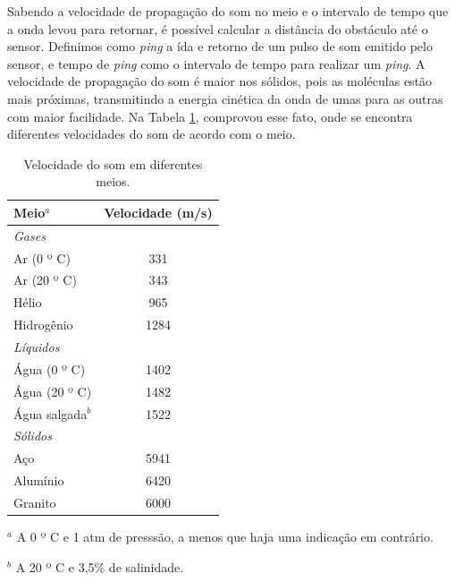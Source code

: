 Sabendo a velocidade de propagação do som no meio e o intervalo de tempo que a onda levou para retornar, é possível calcular a distância do obstáculo até o sensor. 
Definimos como \textit{ping} a ída e retorno de um pulso de som emitido pelo sensor, e tempo de \textit{ping} como o intervalo de tempo para realizar um \textit{ping}. 
A velocidade de propagação do som é maior nos sólidos, pois as moléculas estão mais próximas, transmitindo a energia cinética da onda de umas para as outras com maior facilidade. 
Na Tabela \ref{tab:vel_som}, \cite{halliday2008fundamentals} comprovou esse fato, onde se encontra diferentes velocidades do som de acordo com o meio.

\begin{table}[H]
    \centering
    \begin{threeparttable}
    \caption{Velocidade do som em diferentes meios.}
    \label{tab:vel_som}
    \begin{tabular}{lc}
        \toprule
            \textbf{Meio$^a$} & \textbf{Velocidade (m/s)} \\ 
        \midrule
            \textit{Gases} &  \\
            Ar (0 º C) & 331 \\
            Ar (20 º C) & 343 \\
            Hélio & 965 \\
            Hidrogênio & 1284 \\
            \textit{Líquidos} &  \\
            Água (0 º C) & 1402 \\
            Água (20 º C) & 1482 \\
            Água salgada$^b$ & 1522 \\
            \textit{Sólidos} &  \\
            Aço & 5941 \\
            Alumínio & 6420 \\
            Granito & 6000 \\ \bottomrule
    \end{tabular}
    \begin{tablenotes}
        \item $^a$ A 0 º C e 1 atm de presssão, a menos que haja uma indicação em contrário.
        \item $^b$ A 20 º C e 3,5\% de salinidade.
    \end{tablenotes}
    \end{threeparttable}
\end{table}


